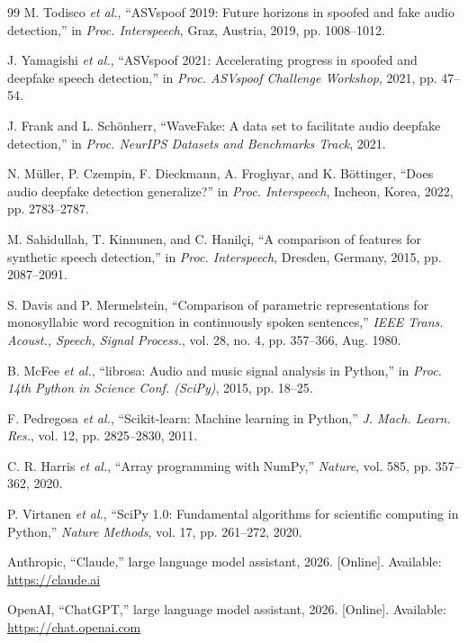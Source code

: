 \documentclass[journal,10pt]{IEEEtran}
\begin{document}
\begin{thebibliography}{99}
M. Todisco \emph{et al.}, ``ASVspoof 2019: Future horizons in spoofed and
fake audio detection,'' in \emph{Proc. Interspeech}, Graz, Austria, 2019,
pp. 1008--1012.

J. Yamagishi \emph{et al.}, ``ASVspoof 2021: Accelerating progress in
spoofed and deepfake speech detection,'' in \emph{Proc. ASVspoof Challenge
Workshop}, 2021, pp. 47--54.

J. Frank and L. Sch\"onherr, ``WaveFake: A data set to facilitate audio
deepfake detection,'' in \emph{Proc. NeurIPS Datasets and Benchmarks
Track}, 2021.

N. M\"uller, P. Czempin, F. Dieckmann, A. Froghyar, and K. B\"ottinger,
``Does audio deepfake detection generalize?'' in \emph{Proc. Interspeech},
Incheon, Korea, 2022, pp. 2783--2787.

M. Sahidullah, T. Kinnunen, and C. Hanil\c{c}i, ``A comparison of features
for synthetic speech detection,'' in \emph{Proc. Interspeech}, Dresden,
Germany, 2015, pp. 2087--2091.

S. Davis and P. Mermelstein, ``Comparison of parametric representations for
monosyllabic word recognition in continuously spoken sentences,''
\emph{IEEE Trans. Acoust., Speech, Signal Process.}, vol. 28, no. 4,
pp. 357--366, Aug. 1980.

B. McFee \emph{et al.}, ``librosa: Audio and music signal analysis in
Python,'' in \emph{Proc. 14th Python in Science Conf. (SciPy)}, 2015,
pp. 18--25.

F. Pedregosa \emph{et al.}, ``Scikit-learn: Machine learning in Python,''
\emph{J. Mach. Learn. Res.}, vol. 12, pp. 2825--2830, 2011.

C. R. Harris \emph{et al.}, ``Array programming with NumPy,''
\emph{Nature}, vol. 585, pp. 357--362, 2020.

P. Virtanen \emph{et al.}, ``SciPy 1.0: Fundamental algorithms for
scientific computing in Python,'' \emph{Nature Methods}, vol. 17,
pp. 261--272, 2020.

Anthropic, ``Claude,'' large language model assistant, 2026. [Online].
Available: \url{https://claude.ai}

OpenAI, ``ChatGPT,'' large language model assistant, 2026. [Online].
Available: \url{https://chat.openai.com}
\end{thebibliography}
\end{document}
